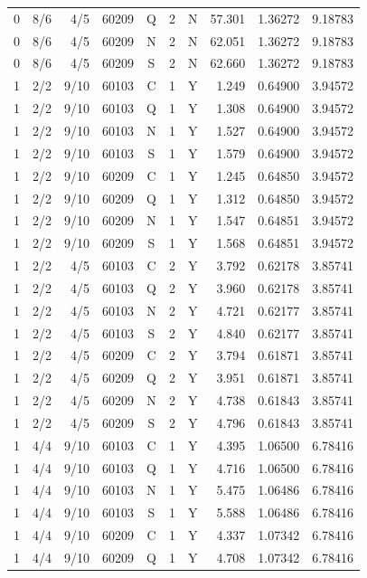 \begin{longtable}{rlrrcccrrr}
0 & 8/6 & 4/5 & 60209 & Q & 2 & N & 57.301 & 1.36272 & 9.18783 \\
0 & 8/6 & 4/5 & 60209 & N & 2 & N & 62.051 & 1.36272 & 9.18783 \\
0 & 8/6 & 4/5 & 60209 & S & 2 & N & 62.660 & 1.36272 & 9.18783 \\
1 & 2/2 & 9/10 & 60103 & C & 1 & Y & 1.249 & 0.64900 & 3.94572 \\
1 & 2/2 & 9/10 & 60103 & Q & 1 & Y & 1.308 & 0.64900 & 3.94572 \\
1 & 2/2 & 9/10 & 60103 & N & 1 & Y & 1.527 & 0.64900 & 3.94572 \\
1 & 2/2 & 9/10 & 60103 & S & 1 & Y & 1.579 & 0.64900 & 3.94572 \\
1 & 2/2 & 9/10 & 60209 & C & 1 & Y & 1.245 & 0.64850 & 3.94572 \\
1 & 2/2 & 9/10 & 60209 & Q & 1 & Y & 1.312 & 0.64850 & 3.94572 \\
1 & 2/2 & 9/10 & 60209 & N & 1 & Y & 1.547 & 0.64851 & 3.94572 \\
1 & 2/2 & 9/10 & 60209 & S & 1 & Y & 1.568 & 0.64851 & 3.94572 \\
1 & 2/2 & 4/5 & 60103 & C & 2 & Y & 3.792 & 0.62178 & 3.85741 \\
1 & 2/2 & 4/5 & 60103 & Q & 2 & Y & 3.960 & 0.62178 & 3.85741 \\
1 & 2/2 & 4/5 & 60103 & N & 2 & Y & 4.721 & 0.62177 & 3.85741 \\
1 & 2/2 & 4/5 & 60103 & S & 2 & Y & 4.840 & 0.62177 & 3.85741 \\
1 & 2/2 & 4/5 & 60209 & C & 2 & Y & 3.794 & 0.61871 & 3.85741 \\
1 & 2/2 & 4/5 & 60209 & Q & 2 & Y & 3.951 & 0.61871 & 3.85741 \\
1 & 2/2 & 4/5 & 60209 & N & 2 & Y & 4.738 & 0.61843 & 3.85741 \\
1 & 2/2 & 4/5 & 60209 & S & 2 & Y & 4.796 & 0.61843 & 3.85741 \\
1 & 4/4 & 9/10 & 60103 & C & 1 & Y & 4.395 & 1.06500 & 6.78416 \\
1 & 4/4 & 9/10 & 60103 & Q & 1 & Y & 4.716 & 1.06500 & 6.78416 \\
1 & 4/4 & 9/10 & 60103 & N & 1 & Y & 5.475 & 1.06486 & 6.78416 \\
1 & 4/4 & 9/10 & 60103 & S & 1 & Y & 5.588 & 1.06486 & 6.78416 \\
1 & 4/4 & 9/10 & 60209 & C & 1 & Y & 4.337 & 1.07342 & 6.78416 \\
1 & 4/4 & 9/10 & 60209 & Q & 1 & Y & 4.708 & 1.07342 & 6.78416 \\

\end{longtable}
